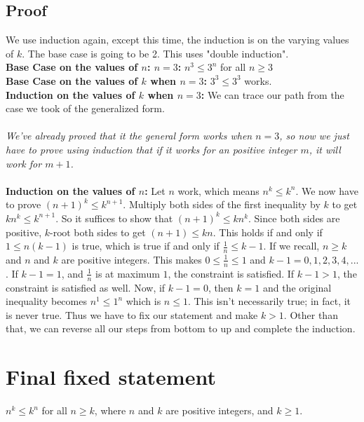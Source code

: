 \documentclass{article}
\begin{document}
\subsection{Proof}

We use induction again, except this time, the induction is on the varying values of $k$. The base case is going to be 2. This uses "double induction". \\



\textbf{Base Case on the values of $n$: $n=3$: } $n^3 \le 3^n$ for all $n \ge 3$\\


	
 \textbf{Base Case on the values of $k$ when $n=3$:} $3^3 \le 3^3$ works. \\
        
        
        
 \textbf{Induction on the values of $k$ when $n=3$:} We can trace our path from the case we took of the generalized form. \\ \\
        
        

\textit{We've already proved that it the general form works when $n=3$, so now we just have to prove using induction that if it works for an positive integer $m$, it will work for $m+1$.} \\ \\ 




\textbf{Induction on the values of $n$:} Let $n$ work, which means $n^k \le k^n$. We now have to prove $(n+1)^k \le k^{n+1}$. Multiply both sides of the first inequality by $k$ to get $kn^k \le k^{n+1}$. So it suffices to show that $(n+1)^k \le kn^k$. Since both sides are positive, $k\text{-root}$ both sides to get $(n+1) \le kn$. This holds if and only if $1 \le n(k-1)$ is true, which is true if and only if $\frac{1}{n} \le k-1$. If we recall, $n \ge k$ and $n$ and $k$ are positive integers. This makes $0 \le \frac{1}{n} \le 1$ and $k-1=0, 1, 2, 3, 4, ...$ .    If $k-1=1$, and $\frac{1}{n}$ is at maximum $1$, the constraint is satisfied. If $k-1>1$, the constraint is satisfied as well. Now, if $k-1=0$, then $k=1$ and the original inequality becomes $n^1 \le 1^n$ which is $n \le 1$. This isn't necessarily true; in fact, it is never true. Thus we have to fix our statement and make $k>1$. Other than that, we can reverse all our steps from bottom to up and complete the induction. 
\noindent\makebox[\linewidth]{\rule{\paperwidth}{0.8pt}}

\section{Final fixed statement}
$n^k \le k^n$ for all $n\ge k$, where $n$ and $k$ are positive integers, and $k \ge 1$. \square

\noindent\makebox[\linewidth]{\rule{\paperwidth}{0.8pt}}\\
\end{document}

